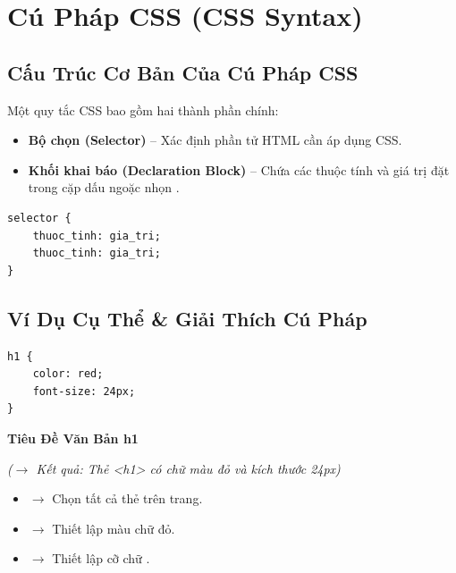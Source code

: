\section{Cú Pháp CSS (CSS Syntax)}

\subsection{Cấu Trúc Cơ Bản Của Cú Pháp CSS}
Một quy tắc CSS bao gồm hai thành phần chính:
\begin{itemize}[leftmargin=1.5em, itemsep=2pt, parsep=0pt]
    \item \textbf{Bộ chọn (Selector)} -- Xác định phần tử HTML cần áp dụng CSS.
    \item \textbf{Khối khai báo (Declaration Block)} -- Chứa các thuộc tính và giá trị đặt trong cặp dấu ngoặc nhọn \codeinline{\{\}}.
\end{itemize}

\begin{codeWindow}
\begin{lstlisting}[language=CSS3]
selector {
    thuoc_tinh: gia_tri;
    thuoc_tinh: gia_tri;
}
\end{lstlisting}
\end{codeWindow}

\subsection{Ví Dụ Cụ Thể \& Giải Thích Cú Pháp}
\begin{codeWindow}
\begin{lstlisting}[language=CSS3]
h1 {
    color: red;
    font-size: 24px;
}
\end{lstlisting}
\end{codeWindow}

\begin{browserWindow}
\sffamily\small
{\color{red}\bfseries\Large Tiêu Đề Văn Bản h1} \par\vspace{4pt}
\textcolor{gray!70}{\small\textit{($\rightarrow$ Kết quả: Thẻ <h1> có chữ màu đỏ và kích thước 24px)}}
\end{browserWindow}

\begin{noteBox}
\begin{itemize}[leftmargin=1.5em, itemsep=2pt, parsep=0pt]
    \item {} $\rightarrow$ Chọn tất cả thẻ  trên trang.
    \item {} $\rightarrow$ Thiết lập màu chữ đỏ.
    \item {} $\rightarrow$ Thiết lập cỡ chữ \codeinline{24px}.
\end{itemize}
\end{noteBox}

